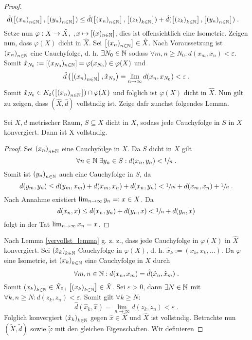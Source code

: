 \begin{proof}
\begin{align*}
		 \hat d(\left[ \left (x_n\right )_{n\in \mathbb{N}}\right],\left[ \left (y_n\right )_{n\in \mathbb{N}}\right]) &\leq \hat d(\left[ \left (x_n\right )_{n\in \mathbb{N}}\right], \left[ \left (z_k\right )_{k\in \mathbb{N}}\right]) + \hat d(\left[ \left (z_k\right )_{k\in \mathbb{N}}\right], \left[ \left (y_n\right )_{n\in \mathbb{N}}\right]) \;.
	\end{align*}
	Setze nun
	\(\varphi: X \to \hat X, \;, x \mapsto \left[ (x)_{n\in\mathbb{N}}\right]\), dies ist offensichtlich eine Isometrie. Zeigen nun, dass $\varphi(X)$ dicht in $\hat X$. Sei $\left[ \left (x_n\right )_{n\in \mathbb{N}}\right] \in \hat X$. Nach Voraussetzung ist $\left (x_n\right )_{n\in \mathbb{N}}$ eine Cauchyfolge, d. h. $\exists N_0 \in \mathbb{N}$ sodass \(\forall m,n \geq  N_0: d(x_m, x_n) < \varepsilon \). Somit \(\hat x_{N_0} := \left[ (x_{N_0})_{n \in \mathbb{N}}\right] = \varphi(x_{N_0}) \in \varphi(X)\) und
	\[\hat d\left (\left[ \left (x_n\right )_{n\in \mathbb{N}}\right], \hat x_{N_0} \right) = \lim_{n\to\infty} d(x_n, x_{N_0})< \varepsilon\; .\]
	Somit \(\hat x_{N_0} \in K_\varepsilon (\left[ \left (x_n\right )_{n\in \mathbb{N}}\right]) \cap \varphi(X)\) und folglich ist \(\varphi(X)\) dicht in $\hat X$.  Nun gilt zu zeigen, dass $(\hat X, \hat d)$ vollst\as ndig ist. Zeige daf\us r zun\as chst folgendes Lemma.
	\begin{lemma}
		Sei \(X,d\) metrischer Raum, $S\subseteq X$ dicht in $X$, sodass jede Cauchyfolge in $S$ in $X$ konvergiert. Dann ist X vollst\as ndig.\label{vervollst_lemma}
	\end{lemma}
	\begin{proof}
		Sei $\left (x_n\right )_{n\in \mathbb{N}}$ eine Cauchyfolge in $X$. Da $S$ dicht in $X$ gilt
		\[\forall n \in \mathbb{N} \;\exists y_n \in S: d(x_n, y_n) < \sfrac 1n \;.\]
		Somit ist \(\left (y_n\right )_{n\in \mathbb{N}}\) auch eine Cauchyfolge in $S$, da
		\[d(y_m, y_n) \leq d(y_m, x_m) + d(x_m, x_n) + d(x_n, y_n) < \sfrac 1m + d(x_m, x_n) + \sfrac 1n \;.\]
		Nach Annahme existiert $\lim_{n \to \infty} y_n =: x \in X$. Da
		\[d(x_n, x) \leq d(x_n, y_n) + d(y_n, x) < \sfrac 1n + d(y_n, x)\]
		folgt in der Tat \(\lim_{n \to \infty} x_n = x\).
	\end{proof}
	Nach Lemma \ref{vervollst_lemma} g. z. z., dass jede Cauchyfolge in \(\varphi(X) \) in $\hat X$ konvergiert. Sei $\left (\hat x_k\right )_{k\in \mathbb{N}}$ Cauchyfolge in $\varphi(X)$, d. h. \(\hat x_k := (x_k, x_k,\ldots)\). Da $\varphi$ eine Isometrie, ist $\left (x_k\right )_{k\in \mathbb{N}}$ eine Cauchyfolge in $X$ durch 
	\[\forall m, n \in \mathbb{N}: d(x_n, x_m) = \hat d(\hat x_n, \hat x_m) \;.\]
	Somit \(\left (x_k\right )_{k\in \mathbb{N}} \in \hat X_0\), \(\left[ \left (x_k\right )_{k\in \mathbb{N}}\right] \in \hat X\). Sei $\varepsilon >0$, dann $\exists N \in \mathbb{N}$ mit \(\forall k, n \geq N: d(z_k, z_n) < \varepsilon\). Somit gilt \(\forall k \geq N\):
	\[\hat d(\hat x_k, \hat x) = \lim_{n\to\infty} d(z_k, z_n) < \varepsilon \;.\]
	Folglich konvergiert $\left (\hat x_k\right )_{k\in \mathbb{N}}$ gegen $\hat x \in \hat X$ und $\hat X$ ist vollst\as ndig.
	Betrachte nun \((\tilde X, \tilde d)\) sowie \(\tilde \varphi\) mit den gleichen Eigenschaften. Wir definieren 

\end{proof}
